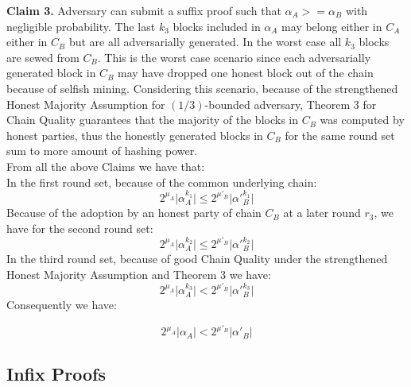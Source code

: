 \documentclass[11pt,a4paper]{article}
\begin{document}

\textbf{Claim 3.} Adversary can submit a suffix proof such that $\alpha_A >= \alpha_B$ with negligible probability.
The last $k_3$ blocks included in $\alpha_A$ may belong either in $C_A$ either in $C_B$ but are all adversarially generated. In the worst case  all $k_3 $ blocks are sewed from $C_B$. This is the worst case scenario since each adversarially generated block in $C_B$ may have dropped one honest block out of the chain because of selfish mining. Considering this scenario, because of the strengthened Honest Majority Assumption for $(1/3)$-bounded adversary, Theorem 3 for Chain Quality guarantees that the majority of the blocks in $C_B$ was computed by honest parties, thus the honestly generated blocks in $C_B$ for the same round set sum to more amount of hashing power.\\
From all the above Claims we have that:\\
In the first round set, because of the common underlying chain:
\begin{equation} \label{eq_v_round_set_1}
2^{\mu_A} \vert \alpha_A^{k_1} \vert \leq 2^{\mu'_B} \vert \alpha'{_B^{k_1}} \vert
\end{equation}
Because of the adoption by an honest party of chain $C_B$ at a later round $r_3$, we have for the second round set:
\begin{equation} \label{eq_v_round_set_2}
2^{\mu_A} \vert \alpha_A^{k_2} \vert \leq 2^{\mu'_B} \vert \alpha'{_B^{k_2}} \vert
\end{equation}
In the third round set, because of good Chain Quality under the strengthened Honest Majority Assumption and Theorem 3 we have:
\begin{equation} \label{eq_v_round_set_3}
2^{\mu_A} \vert \alpha_A^{k_3} \vert < 2^{\mu'_B} \vert \alpha'{_B^{k_3}} \vert
\end{equation}
Consequently we have:

\begin{equation} \label{eq_v_all_round_sets}
2^{\mu_A} \vert \alpha_A \vert < 2^{\mu'_B} \vert \alpha'{_B} \vert
\end{equation}

\subsection{Infix Proofs}

\end{document}
